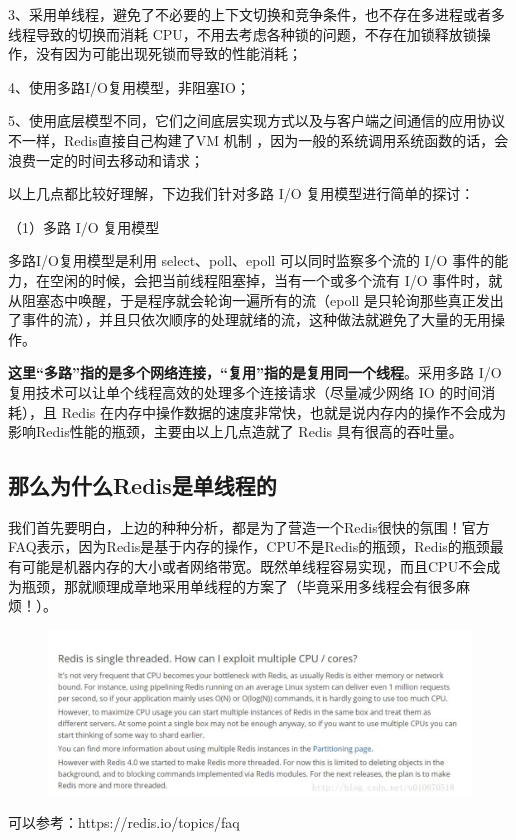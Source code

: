 \documentclass[12pt]{article}
\begin{document}
3、采用单线程，避免了不必要的上下文切换和竞争条件，也不存在多进程或者多线程导致的切换而消耗 CPU，不用去考虑各种锁的问题，不存在加锁释放锁操作，没有因为可能出现死锁而导致的性能消耗；

4、使用多路I/O复用模型，非阻塞IO；

5、使用底层模型不同，它们之间底层实现方式以及与客户端之间通信的应用协议不一样，Redis直接自己构建了VM 机制 ，因为一般的系统调用系统函数的话，会浪费一定的时间去移动和请求；

以上几点都比较好理解，下边我们针对多路 I/O 复用模型进行简单的探讨：

（1）多路 I/O 复用模型

多路I/O复用模型是利用 select、poll、epoll 可以同时监察多个流的 I/O 事件的能力，在空闲的时候，会把当前线程阻塞掉，当有一个或多个流有 I/O 事件时，就从阻塞态中唤醒，于是程序就会轮询一遍所有的流（epoll 是只轮询那些真正发出了事件的流），并且只依次顺序的处理就绪的流，这种做法就避免了大量的无用操作。

\textbf{这里“多路”指的是多个网络连接，“复用”指的是复用同一个线程}。采用多路 I/O 复用技术可以让单个线程高效的处理多个连接请求（尽量减少网络 IO 的时间消耗），且 Redis 在内存中操作数据的速度非常快，也就是说内存内的操作不会成为影响Redis性能的瓶颈，主要由以上几点造就了 Redis 具有很高的吞吐量。

\subsection{那么为什么Redis是单线程的}
我们首先要明白，上边的种种分析，都是为了营造一个Redis很快的氛围！官方FAQ表示，因为Redis是基于内存的操作，CPU不是Redis的瓶颈，Redis的瓶颈最有可能是机器内存的大小或者网络带宽。既然单线程容易实现，而且CPU不会成为瓶颈，那就顺理成章地采用单线程的方案了（毕竟采用多线程会有很多麻烦！）。
\begin{figure}[H]
    \centering
    \includegraphics[width=1\textwidth]{fig/Redis_Fast_4.png}
\end{figure}
可以参考：https://redis.io/topics/faq
\end{document}
